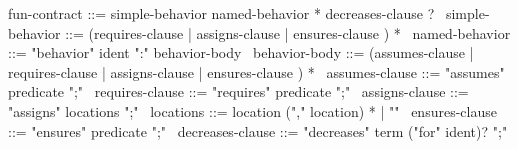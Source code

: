 \begin{syntax}
  fun-contract ::= simple-behavior named-behavior * decreases-clause ? 
  \
  simple-behavior ::= (requires-clause | assigns-clause |
  ensures-clause ) * 
  \
  named-behavior ::= "behavior" ident ":" behavior-body 
  \
  behavior-body ::= (assumes-clause | requires-clause | assigns-clause |
              ensures-clause ) * 
              \
  assumes-clause ::= "assumes" predicate ";"
  \
  requires-clause ::= "requires" predicate ";"
  \
  assigns-clause ::= "assigns" locations ";"
  \
  locations ::= location ("," location) * | "\nothing" 
  \
  ensures-clause ::= "ensures" predicate ";"
  \
  decreases-clause ::= "decreases" term ("for" ident)? ";"
\end{syntax}
